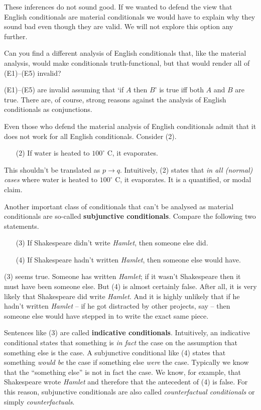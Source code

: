These inferences do not sound good. If we wanted to defend the view that English
conditionals are material conditionals we would have to explain why they sound
bad even though they are valid. We will not explore this option any further.

\begin{exercise}
  Can you find a different analysis of English conditionals that, like the
  material analysis, would make conditionals truth-functional, but that would
  render all of (E1)--(E5) invalid?
\end{exercise}
\begin{solution}
  (E1)--(E5) are invalid assuming that `if $A$ then $B$' is true iff both $A$
  and $B$ are true. There are, of course, strong reasons against the analysis of
  English conditionals as conjunctions.
\end{solution}

Even those who defend the material analysis of English conditionals admit that
it does not work for all English conditionals. Consider (2).
\begin{enumerate}[leftmargin=10mm]
\item[(2)] If water is heated to $100^\circ$ C, it evaporates.
\end{enumerate}
This shouldn't be translated as $p\to q$. Intuitively, (2) states that \emph{in
  all (normal) cases} where water is heated to $100^\circ$ C, it evaporates. It
is a quantified, or modal claim.

Another important class of conditionals that can't be analysed as material
conditionals are so-called \textbf{subjunctive conditionals}. Compare the
following two statements.

\begin{enumerate}[leftmargin=10mm]
  \itemsep-1mm
\item[(3)] If Shakespeare didn't write \emph{Hamlet}, then someone else did.
\item[(4)] If Shakespeare hadn't written \emph{Hamlet}, then someone else
  would have.
\end{enumerate}
%
(3) seems true. Someone has written \emph{Hamlet}; if it wasn't Shakespeare then
it must have been someone else. But (4) is almost certainly false. After all, it
is very likely that Shakespeare did write \emph{Hamlet}. And it is highly
unlikely that if he hadn't written \emph{Hamlet} -- if he got distracted by
other projects, say -- then someone else would have stepped in to write the
exact same piece.

Sentences like (3) are called \textbf{indicative conditionals}. Intuitively, an
indicative conditional states that something is \emph{in fact} the case on the
assumption that something else is the case. A subjunctive conditional like (4)
states that something \emph{would be} the case if something else \emph{were} the
case. Typically we know that the ``something else'' is not in fact the case. We
know, for example, that Shakespeare wrote \emph{Hamlet} and therefore that the
antecedent of (4) is false. For this reason, subjunctive conditionals are also
called \emph{counterfactual conditionals} or simply \emph{counterfactuals}.

